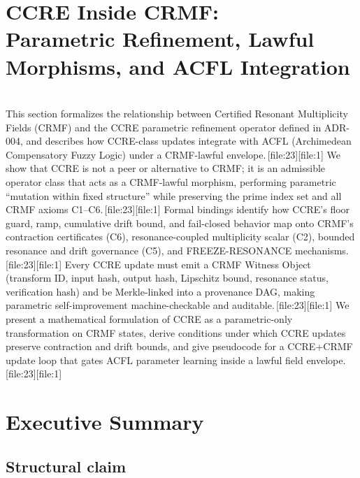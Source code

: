 \documentclass[11pt]{article}
\begin{document}
\section{CCRE Inside CRMF:\\
Parametric Refinement, Lawful Morphisms, and ACFL Integration} \\
This section formalizes the relationship between Certified Resonant Multiplicity Fields (CRMF) and the CCRE parametric refinement operator defined in ADR-004, and describes how CCRE-class updates integrate with ACFL (Archimedean Compensatory Fuzzy Logic) under a CRMF-lawful envelope.\,[file:23][file:1]
We show that CCRE is not a peer or alternative to CRMF; it is an admissible operator class that acts as a CRMF-lawful morphism, performing parametric ``mutation within fixed structure'' while preserving the prime index set and all CRMF axioms C1--C6.\,[file:23][file:1]
Formal bindings identify how CCRE's floor guard, ramp, cumulative drift bound, and fail-closed behavior map onto CRMF's contraction certificates (C6), resonance-coupled multiplicity scalar (C2), bounded resonance and drift governance (C5), and FREEZE-RESONANCE mechanisms.\,[file:23][file:1]
Every CCRE update must emit a CRMF Witness Object (transform ID, input hash, output hash, Lipschitz bound, resonance status, verification hash) and be Merkle-linked into a provenance DAG, making parametric self-improvement machine-checkable and auditable.\,[file:23][file:1]
We present a mathematical formulation of CCRE as a parametric-only transformation on CRMF states, derive conditions under which CCRE updates preserve contraction and drift bounds, and give pseudocode for a CCRE+CRMF update loop that gates ACFL parameter learning inside a lawful field envelope.\,[file:23][file:1]


\section{Executive Summary}

\subsection{Structural claim}
\end{document}
